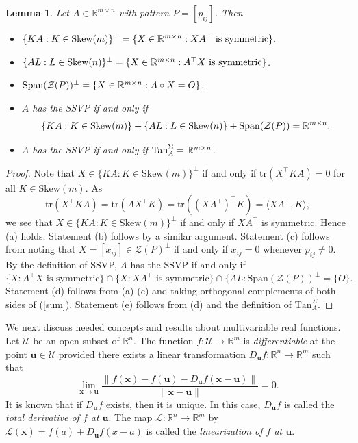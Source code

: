 \documentclass[preprint,12pt]{elsarticle}
\newcommand{\trans  }{^\top}
\newtheorem{lemma}[theorem]{Lemma}
\begin{document}
\begin{lemma}
\label{perp}
Let $A\in \mathbb{R}^{m\times n}$ with pattern $P=[p_{ij}]$.
Then 
\begin{itemize}
\item[\rm (a)] $\{ KA: K \in \mbox{\rm Skew}(m)\}^{\perp}= \{X \in \mathbb{R}^{m\times n}: 
XA\trans  \mbox{ is symmetric} \}.$ 
\item[\rm (b)] $\{ AL: L \in \mbox{\rm Skew}(n)\}^{\perp}= \{X \in \mathbb{R}^{m\times n}:  
A\trans X \mbox{ is symmetric}\}$.
\item[\rm (c)]  $\mbox{\rm Span}( \mathcal{Z}(P))^{\perp} = \{ X \in \mathbb{R}^{m\times n}: A \circ X=O\}$.
\item[\rm (d)] $A$ has the SSVP if and only if 
 \[ \{ KA: K \in \mbox{\rm Skew}(m)\} + \{ AL: L \in \mbox{\rm Skew}(n)\} + \mbox{\rm Span}( \mathcal{Z}(P))=
 \mathbb{R}^{m\times n}.\]
\item[\rm (e)] $A$ has the SSVP if and only if $\mbox{\rm Tan}_A^{\Sigma}=\mathbb{R}^{m\times n}$.
\end{itemize}
\end{lemma}

\begin{proof}
Note that $X \in \{ KA: K \in \mbox{Skew}(m)\}^{\perp}$ if and only if $\mbox{tr}(X\trans KA)=0$
for all $K \in \mbox{Skew}(m)$.  As 
\[ \mbox{tr}(X\trans K A)=\mbox{tr}(A X\trans K)= \mbox{tr}((X A\trans)\trans K)= 
\langle XA\trans, K \rangle,\] 
we see that $X \in \{ KA: K \in \mbox{Skew}(m)\}^{\perp}$ if and only if $XA\trans$
 is symmetric. Hence (a) holds.  Statement (b) follows by a similar argument. Statement (c) follows from noting that  $X=[x_{ij}] \in \mathcal{Z}(P)^{\perp}$ if and only if $x_{ij}=0$ whenever 
$p_{ij} \neq 0$. By the definition of SSVP,  $A$ has the SSVP if and only if 
\begin{equation}
\label{sum}
 \{ X: A\trans X \mbox{ is symmetric}\} 
 \cap \{ X: XA\trans \mbox{ is symmetric}\} \cap \{ AL: \mbox{Span}( \mathcal{Z}(P))^{\perp}= \{ O\}.
\end{equation}
Statement (d) follows from (a)-(c) and taking orthogonal complements of both sides of (\ref{sum}).
Statement (e) follows from (d) and the definition of $\mbox{Tan}_A^{\Sigma}$. 
\end{proof}

We next discuss  needed concepts and results about multivariable real functions. 
Let $\mathcal{U}$ be an open subset of $\mathbb{R}^n$. The
function 
$f\colon \mathcal{U} \rightarrow \mathbb{R}^m$ is {\it differentiable} at the 
point $\mathbf u \in \mathcal{U}$ provided there exists a linear transformation 
$D_{\mathbf u}f: \mathbb{R}^n \rightarrow \mathbb{R}^m$
such that 
\[ 
\lim_{\mathbf x \rightarrow \mathbf u}
\frac{\| f(\mathbf x) -f(\mathbf u) -D_{\mathbf u} f(\mathbf x - \mathbf u) \|} 
{ \| \mathbf x - \mathbf u \|}=0.  
\]
It is known that if $D_{\mathbf u}f$ exists, then it is unique. 
In this case, $D_{\mathbf u}f$ is called the {\it total derivative of $f$ at $\mathbf u$}.  The map $\mathcal{L}: 
\mathbb{R}^n \rightarrow \mathbb{R}^m$ by $\mathcal{L}(\mathbf x)=
f(a)+ D_{\mathbf u}f(x-a)$ is called the {\it linearization of $f$ at $\mathbf u$}.
\end{document}
